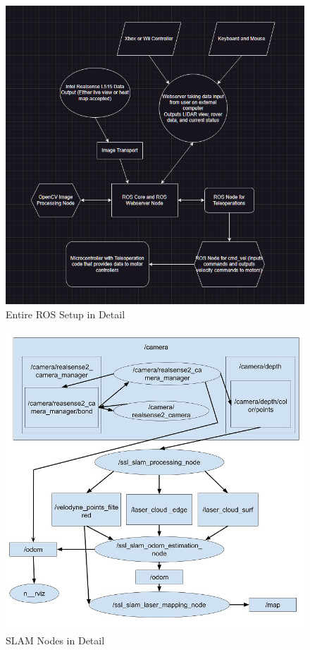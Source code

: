 \documentclass[a4paper, 10pt]{article}
\begin{document}
        \begin{figure} [!h]
			\centering
			\includegraphics[scale=0.6]{Photos/Tier2ROS.png}
			\caption{Entire ROS Setup in Detail}
			\label{ros_schema}
		\end{figure}
		
		\begin{figure} [!h]
			\centering
			\includegraphics[scale=0.6]{Photos/SLAM RQTGraph.jpg}
			\caption{SLAM Nodes in Detail}
			\label{SLAM_schema}
		\end{figure}
\end{document}

